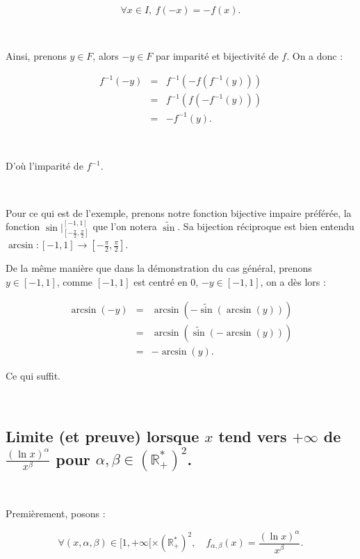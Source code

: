 \documentclass{article}
\begin{document}
\begin{equation*}
    \forall x \in I, \ f(-x) = -f(x).
\end{equation*}

\

Ainsi, prenons $y\in F$, alors $-y \in F$ par imparité et bijectivité de $f$. On a donc : 

\begin{eqnarray*}
f^{-1}(-y) & = & f^{-1}(-f(f^{-1}(y))) \\
           & = & f^{-1}(f(-f^{-1}(y))) \\
           & = & -f^{-1}(y).
\end{eqnarray*}

\

D'où l'imparité de $f^{-1}$.

\

Pour ce qui est de l'exemple, prenons notre fonction bijective impaire préférée, la fonction $\textstyle \sin |_{\left[ -\frac{\pi}{2}, \frac{\pi}{2}\right] }^{[-1,1]}$ que l'on notera $\widetilde{\sin}$. Sa bijection réciproque est bien entendu $\textstyle \arcsin : [-1,1] \to \left[ -\frac{\pi}{2}, \frac{\pi}{2}\right]$.

De la même manière que dans la démonstration du cas général, prenons $y\in [-1, 1]$, comme $[-1,1]$ est centré en $0$, $-y\in [-1,1]$, on a dès lors : 

\begin{eqnarray*}
\arcsin(-y) & = & \arcsin(-\widetilde{\sin}(\arcsin(y))) \\
           & = & \arcsin(\widetilde{\sin}(-\arcsin(y))) \\
           & = & -\arcsin(y).
\end{eqnarray*}

Ce qui suffit.

\


\subsection{Limite (et preuve) lorsque $x$ tend vers $+\infty$ de $\frac{(\ln x)^{\alpha}}{x^{\beta}}$ pour $\alpha ,\beta \in \left( \mathbb{R}_+^*\right) ^2$.} 

\

Premièrement, posons : 

\begin{equation*}
    \forall  (x,\alpha,\beta)\in [1,+\infty[ \times \left( \mathbb{R}_+^*\right) ^2, \quad  f_{\alpha,\beta}(x)=\frac{(\ln x)^{\alpha}}{x^{\beta}}.
\end{equation*}
\end{document}
